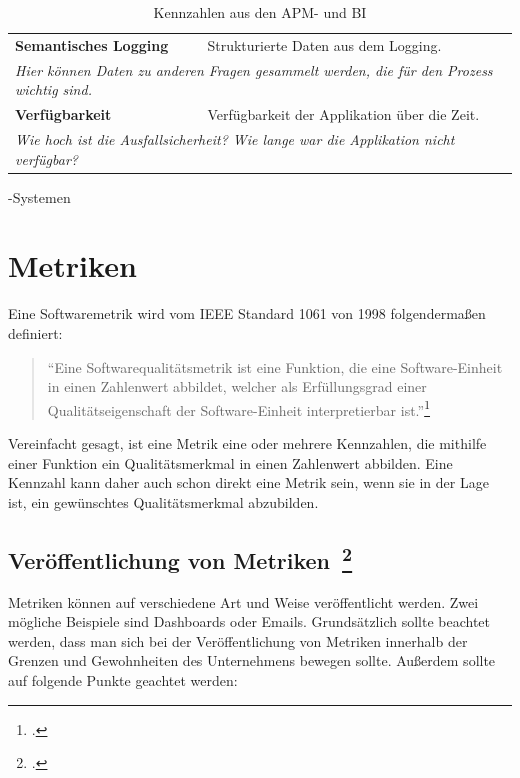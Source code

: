 \begin{table}[H]
\begin{tabular}{p{5cm}p{9.5cm}}
  \textbf{Semantisches Logging} & Strukturierte Daten aus dem Logging. \\
  \multicolumn{2}{p{14.5cm}}{\textit{Hier können Daten zu anderen Fragen gesammelt werden, die für den Prozess wichtig sind.}} \\ \bottomrule
  \textbf{Verfügbarkeit} & Verfügbarkeit der Applikation über die Zeit. \\
  \multicolumn{2}{p{14.5cm}}{\textit{Wie hoch ist die Ausfallsicherheit? \newline Wie lange war die Applikation nicht verfügbar?}} \\ \bottomrule
  \end{tabular}
  \caption{Kennzahlen aus den \ac{APM}- und \ac{BI}}-Systemen\label{metrics-table-apm}
\end{table}

\newpage
\section{Metriken}

Eine Softwaremetrik wird vom \ac{IEEE} Standard 1061 von 1998 folgendermaßen definiert:
\begin{quote}
  ``Eine Softwarequalitätsmetrik ist eine Funktion, die eine Software-Einheit in einen Zahlenwert abbildet, welcher als Erfüllungsgrad einer Qualitätseigenschaft der Software-Einheit interpretierbar ist.''\footcite[vgl.][S.3]{ieee-1061}
\end{quote}

Vereinfacht gesagt, ist eine Metrik eine oder mehrere Kennzahlen, die mithilfe einer Funktion ein Qualitätsmerkmal in einen Zahlenwert abbilden.
Eine Kennzahl kann daher auch schon direkt eine Metrik sein, wenn sie in der Lage ist, ein gewünschtes Qualitätsmerkmal abzubilden.

\subsection[Veröffentlichung von Metriken]{Veröffentlichung von Metriken~\footcite[vgl.][S.177ff]{davis_agile_2015}}

Metriken können auf verschiedene Art und Weise veröffentlicht werden. Zwei mögliche Beispiele sind Dashboards oder Emails.
Grundsätzlich sollte beachtet werden, dass man sich bei der Veröffentlichung von Metriken innerhalb der Grenzen und Gewohnheiten des Unternehmens bewegen sollte.
Außerdem sollte auf folgende Punkte geachtet werden:

